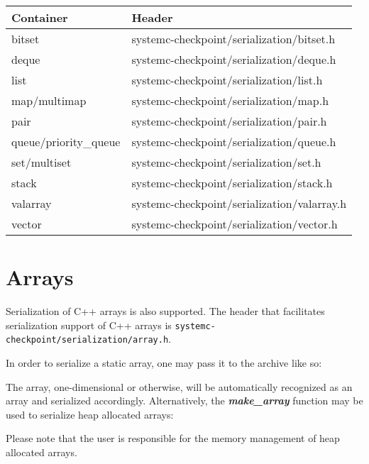 \documentclass[oneside]{memoir}
\begin{document}
\begin{center}
  \begin{tabular}{| l | l |}
    \hline
    Container            & Header \\ \hline
    bitset               & systemc-checkpoint/serialization/bitset.h \\ \hline
    deque                & systemc-checkpoint/serialization/deque.h \\ \hline
    list                 & systemc-checkpoint/serialization/list.h \\ \hline
    map/multimap         & systemc-checkpoint/serialization/map.h \\ \hline
    pair                 & systemc-checkpoint/serialization/pair.h \\ \hline
    queue/priority\_queue & systemc-checkpoint/serialization/queue.h \\ \hline
    set/multiset         & systemc-checkpoint/serialization/set.h \\ \hline
    stack                & systemc-checkpoint/serialization/stack.h \\ \hline
    valarray             & systemc-checkpoint/serialization/valarray.h \\ \hline
    vector               & systemc-checkpoint/serialization/vector.h \\ \hline
  \end{tabular}
\end{center}

\section{Arrays}
\label{arrays}

Serialization of C++ arrays is also supported.
The header that facilitates serialization support of C++ arrays is \texttt{systemc-checkpoint/serialization/array.h}.

In order to serialize a static array, one may pass it to the archive like so:



The array, one-dimensional or otherwise, will be automatically recognized as an array and serialized accordingly.
Alternatively, the \textit{\textbf{make\_array}} function may be used to serialize heap allocated arrays:



Please note that the user is responsible for the memory management of heap allocated arrays.
\end{document}
